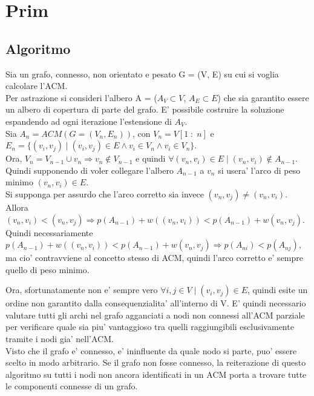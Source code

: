 \chapter{Prim}

\section{Algoritmo}

Sia un grafo, connesso, non orientato e pesato G = (V, E) su cui si voglia calcolare l'ACM. \\
Per astrazione si consideri l'albero A = ($A_V \subset V$, $A_E \subset E$) che sia garantito essere un albero di copertura di parte del grafo.
E' possibile costruire la soluzione espandendo ad ogni iterazione l'estensione di $A_V$. \\

Sia $A_n = ACM(G = (V_n, E_n))$, con $V_n = V[1 \;:\; n]$ e \*
$E_n = \{ (v_i, v_j) \mid (v_i, v_j) \in E \land v_i \in V_n \land v_i \in V_n \}$. \\

Ora, $V_n = V_{n-1} \cup v_n \Rightarrow v_n \notin V_{n-1}$ e quindi $\forall (v_n,v_i) \in E \mid (v_n,v_i) \notin A_{n-1}$. \\

Quindi supponendo di voler collegare l'albero $A_{n-1}$ a $v_n$ si usera' l'arco di peso minimo $(v_n,v_i) \in E$. \\

Si supponga per assurdo che l'arco corretto sia invece $(v_n,v_j) \ne (v_n,v_i)$.  \*
Allora $(v_n,v_i) < (v_n,v_j) \Rightarrow p(A_{n-1}) + w((v_n,v_i)) < p(A_{n-1}) + w(v_n,v_j)$. \*
Quindi necessariamente $p(A_{n-1}) + w((v_n,v_i)) < p(A_{n-1}) + w(v_n,v_j) \Rightarrow p(A_{ni}) < p(A_{nj})$, ma cio' contravviene al concetto stesso di ACM, quindi l'arco corretto e' sempre quello di peso minimo.

Ora, sfortunatamente non e' sempre vero $\forall i,j \in V \mid (v_i, v_j) \in E$, quindi esite un ordine non garantito dalla consequenzialita' all'interno di V. E' quindi necessario valutare tutti gli archi nel grafo agganciati a nodi non connessi all'ACM parziale per verificare quale sia piu' vantaggioso tra quelli raggiungibili esclusivamente tramite i nodi gia' nell'ACM. \\

Visto che il grafo e' connesso, e' ininfluente da quale nodo si parte, puo' essere scelto in modo arbitrario. Se il grafo non fosse connesso, la reiterazione di questo algoritmo su tutti i nodi non ancora identificati in un ACM porta a trovare tutte le componenti connesse di un grafo. \\

